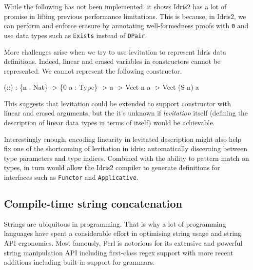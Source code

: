 \documentclass[
]{article}
\newenvironment{Shaded}{}{}
\newcommand{\DataTypeTok}[1]{\textcolor[rgb]{0.56,0.13,0.00}{#1}}
\newcommand{\DecValTok}[1]{\textcolor[rgb]{0.25,0.63,0.44}{#1}}
\newcommand{\NormalTok}[1]{#1}
\newcommand{\OperatorTok}[1]{\textcolor[rgb]{0.40,0.40,0.40}{#1}}
\newcommand{\OtherTok}[1]{\textcolor[rgb]{0.00,0.44,0.13}{#1}}
\begin{document}
While the following has not been implemented, it shows Idris2 has a lot
of promise in lifting previous performance limitations. This is because,
in Idris2, we can perform and enforce erasure by annotating
well-formedness proofs with \texttt{0} and use data types such as
\texttt{Exists} instead of \texttt{DPair}.

More challenges arise when we try to use levitation to represent Idris
data definitions. Indeed, linear and erased variables in constructors
cannot be represented. We cannot represent the following constructor.

\begin{Shaded}
\begin{Highlighting}[]
\NormalTok{(}\OtherTok{::}\NormalTok{) }\OperatorTok{:}\NormalTok{ \{n }\OperatorTok{:} \DataTypeTok{Nat}\NormalTok{\} }\OtherTok{{-}\textgreater{}}\NormalTok{ \{}\DecValTok{0}\NormalTok{ a }\OperatorTok{:} \DataTypeTok{Type}\NormalTok{\} }\OtherTok{{-}\textgreater{}}\NormalTok{ a }\OtherTok{{-}\textgreater{}} \DataTypeTok{Vect}\NormalTok{ n a }\OtherTok{{-}\textgreater{}} \DataTypeTok{Vect}\NormalTok{ (}\DataTypeTok{S}\NormalTok{ n) a }
\end{Highlighting}
\end{Shaded}

This suggests that levitation could be extended to support constructor
with linear and erased arguments, but the it's unknown if
\emph{levitation} itself (defining the description of linear data types
in terms of itself) would be achievable.

Interestingly enough, encoding linearity in levitated description might
also help fix one of the shortcoming of levitation in idris:
automatically discerning between type parameters and type indices.
Combined with the ability to pattern match on types, in turn would allow
the Idris2 compiler to generate definitions for interfaces such as
\texttt{Functor} and \texttt{Applicative}.

\hypertarget{compile-time-string-concatenation}{%
\subsection{Compile-time string
concatenation}\label{compile-time-string-concatenation}}

Strings are ubiquitous in programming. That is why a lot of programming
languages have spent a considerable effort in optimising string usage
and string API ergonomics. Most famously, Perl is notorious for its
extensive and powerful string manipulation API including first-class
regex support with more recent additions including built-in support for
grammars.
\end{document}
